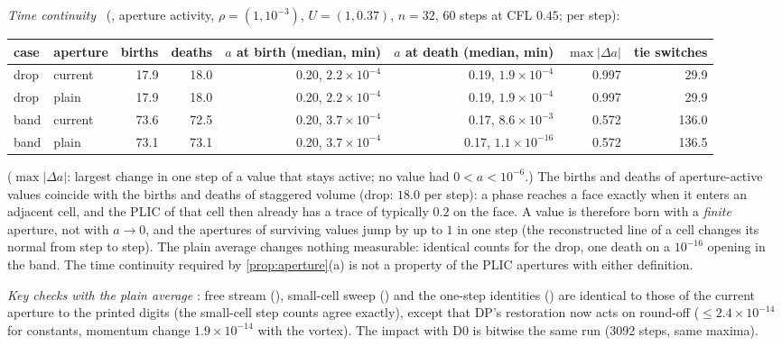 \emph{Time continuity} \meas\ (, aperture activity, $\rho=(1,10^{-3})$,
$U=(1,0.37)$, $n=32$, 60 steps at CFL $0.45$; per step):
\begin{center}\footnotesize
\setlength\tabcolsep{4pt}
\begin{tabular}{@{}llrrrrrr@{}}
\toprule
case & aperture & births & deaths & $a$ at birth (median, min) & $a$ at death (median, min) & $\max|\Delta a|$ & tie switches\\
\midrule
drop & current & 17.9 & 18.0 & 0.20, $2.2\times10^{-4}$ & 0.19, $1.9\times10^{-4}$ & 0.997 & 29.9\\
drop & plain & 17.9 & 18.0 & 0.20, $2.2\times10^{-4}$ & 0.19, $1.9\times10^{-4}$ & 0.997 & 29.9\\
band & current & 73.6 & 72.5 & 0.20, $3.7\times10^{-4}$ & 0.17, $8.6\times10^{-3}$ & 0.572 & 136.0\\
band & plain & 73.1 & 73.1 & 0.20, $3.7\times10^{-4}$ & 0.17, $1.1\times10^{-16}$ & 0.572 & 136.5\\
\bottomrule
\end{tabular}
\end{center}
($\max|\Delta a|$: largest change in one step of a value that stays active; no value had
$0<a<10^{-6}$.)  The births and deaths of aperture-active values coincide with the births and
deaths of staggered volume (drop: $18.0$ per step): a phase reaches a face exactly when it enters
an adjacent cell, and the PLIC of that cell then already has a trace of typically $0.2$ on the
face.  A value is therefore born with a \emph{finite} aperture, not with $a\to0$, and the
apertures of surviving values jump by up to $1$ in one step (the reconstructed line of a cell
changes its normal from step to step).  The plain average changes nothing measurable: identical
counts for the drop, one death on a $10^{-16}$ opening in the band.  The time continuity
required by \cref{prop:aperture}(a) is not a property of the PLIC apertures with either
definition.

\emph{Key checks with the plain average} \meas: free stream (),
small-cell sweep () and the one-step identities
() are identical to those of the current aperture to the printed digits
(the small-cell step counts agree exactly), except that DP's restoration now acts on round-off
($\le2.4\times10^{-14}$ for constants, momentum change $1.9\times10^{-14}$ with the vortex).
The impact with D0 is bitwise the same run (3092 steps, same maxima).
